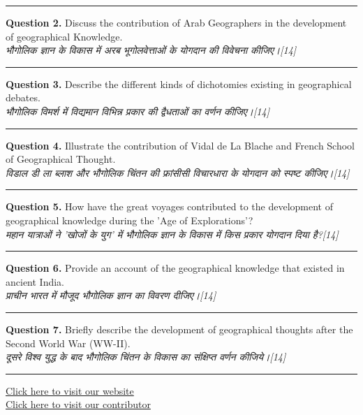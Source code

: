 \documentclass[11pt,a4paper]{article}
\newcommand{\pts}[1]{\hfill   \textit{[#1]}}
\begin{document}
\medskip\rule{\linewidth}{0.2pt}\medskip




\noindent   \textbf{Question 2.} Discuss the contribution of Arab Geographers in the development of geographical Knowledge.\\
   \textit{भौगोलिक ज्ञान के विकास में अरब भूगोलवेत्ताओं के योगदान की विवेचना कीजिए।}\pts{14}

\medskip\rule{\linewidth}{0.2pt}\medskip




\noindent   \textbf{Question 3.} Describe the different kinds of dichotomies existing in geographical debates.\\
   \textit{भौगोलिक विमर्श में विद्यमान विभिन्न प्रकार की द्वैधताओं का वर्णन कीजिए।}\pts{14}

\medskip\rule{\linewidth}{0.2pt}\medskip




\noindent   \textbf{Question 4.} Illustrate the contribution of Vidal de La Blache and French School of Geographical Thought.\\
   \textit{विडाल डी ला ब्लाश और भौगोलिक चिंतन की फ्रांसीसी विचारधारा के योगदान को स्पष्ट कीजिए।}\pts{14}

\medskip\rule{\linewidth}{0.2pt}\medskip




\noindent   \textbf{Question 5.} How have the great voyages contributed to the development of geographical knowledge during the 'Age of Explorations'?\\
   \textit{महान यात्राओं ने 'खोजों के युग' में भौगोलिक ज्ञान के विकास में किस प्रकार योगदान दिया है?}\pts{14}

\medskip\rule{\linewidth}{0.2pt}\medskip




\noindent   \textbf{Question 6.} Provide an account of the geographical knowledge that existed in ancient India.\\
   \textit{प्राचीन भारत में मौजूद भौगोलिक ज्ञान का विवरण दीजिए।}\pts{14}

\medskip\rule{\linewidth}{0.2pt}\medskip




\noindent   \textbf{Question 7.} Briefly describe the development of geographical thoughts after the Second World War (WW-II).\\
   \textit{दूसरे विश्व युद्ध के बाद भौगोलिक चिंतन के विकास का संक्षिप्त वर्णन कीजिये।}\pts{14}

\vfill
\rule{\linewidth}{0.4pt}

\begin{center}\small
\href{https://bhu-exam.vercel.app/}{Click here to visit our website}\\[4pt]
\href{https://me-aryan.vercel.app/}{Click here to visit our contributor}
\end{center}
\end{document}
